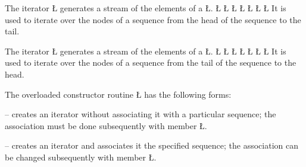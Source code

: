 \documentclass[openright,twoside]{report}
\begin{document}
The iterator \LGinlinetrue\LGbegin\lgrinde\L{}\endlgrinde\LGend{} generates a stream of the elements of a \LGinlinetrue\LGbegin\lgrinde\L{}\endlgrinde\LGend{}.
\LGinlinefalse\LGbegin\lgrinde
\L{}
\L{}
\L{\LB{}}
\L{\LB{}}
\L{\LB{}}
\L{\LB{}}
\L{\LB{\};}}
\endlgrinde\LGend
{}%
%
It is used to iterate over the nodes of a sequence from the head of the sequence to the tail.

The iterator \LGinlinetrue\LGbegin\lgrinde\L{}\endlgrinde\LGend{} generates a stream of the elements of a \LGinlinetrue\LGbegin\lgrinde\L{}\endlgrinde\LGend{}.
\LGinlinefalse\LGbegin\lgrinde
\L{}
\L{}
\L{\LB{}}
\L{\LB{}}
\L{\LB{}}
\L{\LB{}}
\L{\LB{\};}}
\endlgrinde\LGend
{}%
%
It is used to iterate over the nodes of a sequence from the tail of the sequence to the head.

The overloaded constructor routine \LGinlinetrue\LGbegin\lgrinde\L{}\endlgrinde\LGend{} has the following forms:
\begin{prefix}
\item[\LGinlinetrue\LGbegin\lgrinde\L{\LB{\V{uSeqIter}()}}\endlgrinde\LGend{}]
-- creates an iterator without associating it with a particular sequence;
the association must be done subsequently with member \LGinlinetrue\LGbegin\lgrinde\L{}\endlgrinde\LGend{}.

\item[\LGinlinetrue\LGbegin\lgrinde\L{\LB{\V{uSeqIter}(\0\K{const}\0\V{uSeq}\<\V{T}\>\0\&\V{q}\0)}}\endlgrinde\LGend{}]
-- creates an iterator and associates it the specified sequence;
the association can be changed subsequently with member \LGinlinetrue\LGbegin\lgrinde\L{}\endlgrinde\LGend{}.
\end{prefix}
\end{document}
